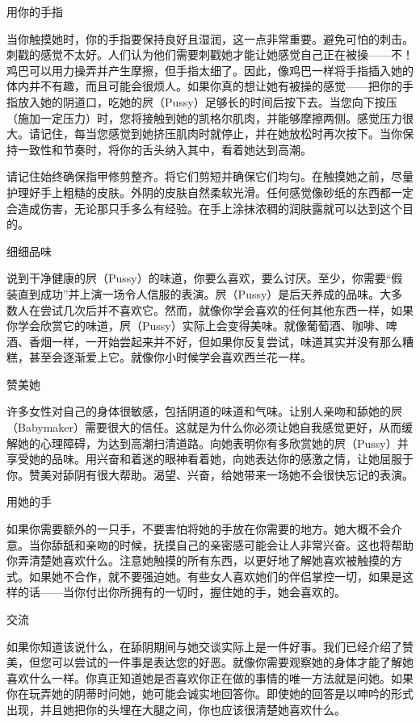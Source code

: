 \documentclass[12pt,UTF8]{ctexbook}
\begin{document}
用你的手指

当你触摸她时，你的手指要保持良好且湿润，这一点非常重要。避免可怕的刺击。刺戳的感觉不太好。人们认为他们需要刺戳她才能让她感觉自己正在被操——不！鸡巴可以用力操弄并产生摩擦，但手指太细了。因此，像鸡巴一样将手指插入她的体内并不有趣，而且可能会很烦人。如果你真的想让她有被操的感觉——把你的手指放入她的阴道口，吃她的屄（Pussy）足够长的时间后按下去。当您向下按压（施加一定压力）时，您将接触到她的凯格尔肌肉，并能够摩擦两侧。感觉压力很大。请记住，每当您感觉到她挤压肌肉时就停止，并在她放松时再次按下。当你保持一致性和节奏时，将你的舌头纳入其中，看着她达到高潮。

请记住始终确保指甲修剪整齐。将它们剪短并确保它们均匀。在触摸她之前，尽量护理好手上粗糙的皮肤。外阴的皮肤自然柔软光滑。任何感觉像砂纸的东西都一定会造成伤害，无论那只手多么有经验。在手上涂抹浓稠的润肤露就可以达到这个目的。

细细品味

说到干净健康的屄（Pussy）的味道，你要么喜欢，要么讨厌。至少，你需要“假装直到成功”并上演一场令人信服的表演。屄（Pussy）是后天养成的品味。大多数人在尝试几次后并不喜欢它。然而，就像你学会喜欢的任何其他东西一样，如果你学会欣赏它的味道，屄（Pussy）实际上会变得美味。就像葡萄酒、咖啡、啤酒、香烟一样，一开始尝起来并不好，但如果你反复尝试，味道其实并没有那么糟糕，甚至会逐渐爱上它。就像你小时候学会喜欢西兰花一样。

赞美她

许多女性对自己的身体很敏感，包括阴道的味道和气味。让别人亲吻和舔她的屄（Babymaker）需要很大的信任。这就是为什么你必须让她自我感觉更好，从而缓解她的心理障碍，为达到高潮扫清道路。向她表明你有多欣赏她的屄（Pussy）并享受她的品味。用兴奋和着迷的眼神看着她，向她表达你的感激之情，让她屈服于你。赞美对舔阴有很大帮助。渴望、兴奋，给她带来一场她不会很快忘记的表演。

用她的手

如果你需要额外的一只手，不要害怕将她的手放在你需要的地方。她大概不会介意。当你舔舐和亲吻的时候，抚摸自己的亲密感可能会让人非常兴奋。这也将帮助你弄清楚她喜欢什么。注意她触摸的所有东西，以更好地了解她喜欢被触摸的方式。如果她不合作，就不要强迫她。有些女人喜欢她们的伴侣掌控一切，如果是这样的话——当你付出你所拥有的一切时，握住她的手，她会喜欢的。

交流

如果你知道该说什么，在舔阴期间与她交谈实际上是一件好事。我们已经介绍了赞美，但您可以尝试的一件事是表达您的好恶。就像你需要观察她的身体才能了解她喜欢什么一样。你真正知道她是否喜欢你正在做的事情的唯一方法就是问她。如果你在玩弄她的阴蒂时问她，她可能会诚实地回答你。即使她的回答是以呻吟的形式出现，并且她把你的头埋在大腿之间，你也应该很清楚她喜欢什么。
\end{document}
